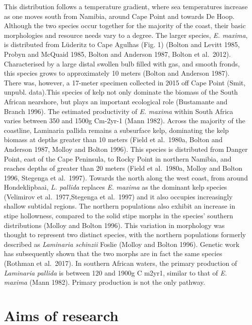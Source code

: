 \documentclass[
]{article}
\begin{document}
This distribution follows a temperature gradient, where sea temperatures
increase as one moves south from Namibia, around Cape Point and towards
De Hoop. Although the two species occur together for the majority of the
coast, their basic morphologies and resource needs vary to a degree. The
larger species, \emph{E. maxima}, is distributed from Lüderitz to Cape
Agulhas (Fig. 1) (Bolton and Levitt 1985, Probyn and McQuaid 1985,
Bolton and Anderson 1987, Bolton et al.~2012). Characterised by a large
distal swollen bulb filled with gas, and smooth fronds, this species
grows to approximately 10 meters (Bolton and Anderson 1987). There was,
however, a 17-meter specimen collected in 2015 off Cape Point (Smit,
unpubl. data).This species of kelp not only dominate the biomass of the
South African nearshore, but plays an important ecological role
(Bustamante and Branch 1996). The estimated productivity of \emph{E.
maxima} within South Africa varies between 350 and 1500g Cm-2yr-1 (Mann
1982). Across the majority of the coastline, Laminaria pallida remains a
subsurface kelp, dominating the kelp biomass at depths greater than 10
meters (Field et al.~1980a, Bolton and Anderson 1987, Molloy and Bolton
1996). This species is distributed from Danger Point, east of the Cape
Peninsula, to Rocky Point in northern Namibia, and reaches depths of
greater than 20 meters (Field et al.~1980a, Molloy and Bolton 1996,
Stegenga et al.~1997). Towards the north along the west coast, from
around Hondeklipbaai, \emph{L. pallida} replaces \emph{E. maxima} as the
dominant kelp species (Velimirov et al.~1977,Stegenga et al.~1997) and
it also occupies increasingly shallow subtidal regions. The northern
populations also exhibit an increase in stipe hollowness, compared to
the solid stipe morphs in the species' southern distributions (Molloy
and Bolton 1996). This variation in morphology was thought to represent
two distinct species, with the northern populations formerly described
as \emph{Laminaria schinzii} Foslie (Molloy and Bolton 1996). Genetic
work has subsequently shown that the two morphs are in fact the same
species (Rothman et al.~2017). In southern African waters, the primary
production of \emph{Laminaria pallida} is between 120 and 1900g C m2yr1,
similar to that of \emph{E. maxima} (Mann 1982). Primary production is
not the only pathway.

\hypertarget{aims-of-research}{%
\section{Aims of research}\label{aims-of-research}}
\end{document}
